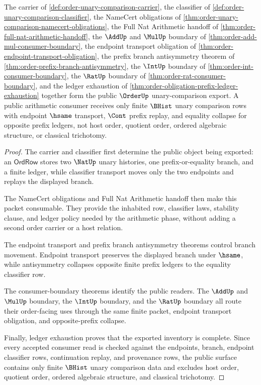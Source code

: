 \begin{theorem}
\label{thm:order-public-unary-comparison-export}
The carrier of \autoref{def:order-unary-comparison-carrier}, the classifier of \autoref{def:order-unary-comparison-classifier}, the NameCert obligations of \autoref{thm:order-unary-comparison-namecert-obligations}, the Full Nat Arithmetic handoff of \autoref{thm:order-full-nat-arithmetic-handoff}, the $\AddUp$ and $\MulUp$ boundary of \autoref{thm:order-add-mul-consumer-boundary}, the endpoint transport obligation of \autoref{thm:order-endpoint-transport-obligation}, the prefix branch antisymmetry theorem of \autoref{thm:order-prefix-branch-antisymmetry}, the $\IntUp$ boundary of \autoref{thm:order-int-consumer-boundary}, the $\RatUp$ boundary of \autoref{thm:order-rat-consumer-boundary}, and the ledger exhaustion of \autoref{thm:order-obligation-prefix-ledger-exhaustion} together form the public $\OrderUp$ unary-comparison export. A public arithmetic consumer receives only finite $\BHist$ unary comparison rows with endpoint $\hsame$ transport, $\Cont$ prefix replay, and equality collapse for opposite prefix ledgers, not host order, quotient order, ordered algebraic structure, or classical trichotomy.
\end{theorem}
\begin{proof}
The carrier and classifier first determine the public object being exported: an $\mathsf{OrdRow}$ stores two $\NatUp$ unary histories, one prefix-or-equality branch, and a finite ledger, while classifier transport moves only the two endpoints and replays the displayed branch.

The NameCert obligations and Full Nat Arithmetic handoff then make this packet consumable. They provide the inhabited row, classifier laws, stability clause, and ledger policy needed by the arithmetic phase, without adding a second order carrier or a host relation.

The endpoint transport and prefix branch antisymmetry theorems control branch movement. Endpoint transport preserves the displayed branch under $\hsame$, while antisymmetry collapses opposite finite prefix ledgers to the equality classifier row.

The consumer-boundary theorems identify the public readers. The $\AddUp$ and $\MulUp$ boundary, the $\IntUp$ boundary, and the $\RatUp$ boundary all route their order-facing uses through the same finite packet, endpoint transport obligation, and opposite-prefix collapse.

Finally, ledger exhaustion proves that the exported inventory is complete. Since every accepted consumer read is checked against the endpoints, branch, endpoint classifier rows, continuation replay, and provenance rows, the public surface contains only finite $\BHist$ unary comparison data and excludes host order, quotient order, ordered algebraic structure, and classical trichotomy.
\end{proof}

